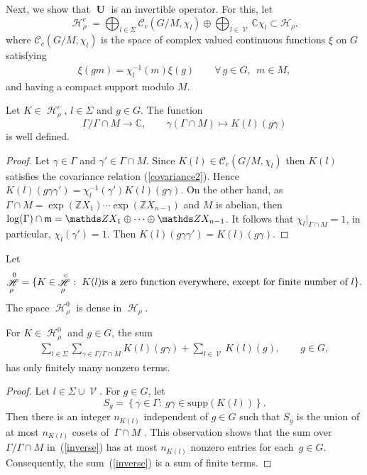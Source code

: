 \documentclass[pdftex]{sigma}
\newcommand{\set}[1]{\left\{#1\right\}}
\DeclareMathOperator{\U}{\mathbf{U}}
\DeclareMathOperator{\nongen}{\mathcal{V}}
\DeclareMathOperator{\Hi}{\mathscr{H}}
\def\dsc{{\mathds C}}
\def\dsz{{\mathds Z}}
\begin{document}
Next, we show that $\U$ is an invertible operator. For this, let
\[
 \Hi_\rho^c =  \bigoplus_{l\in \Sigma} \mathcal{C}_c(G/M,
\chi_l) \oplus \bigoplus_{l\in \nongen} \mathds{C} \chi_l \subset
\mathscr{H}_\rho,
\]
 where $\mathcal{C}_c(G/M, \chi_l)$ is the space
of complex valued continuous functions $\xi$ on $G$ satisfying
\begin{gather}\label{covariance2}
\xi(gm)=\chi_l^{-1}(m) \xi(g) \qquad
  \forall\, g\in G, \ \ m\in M,
\end{gather}
and having a compact support modulo $M$.



\begin{lemma} Let $K\in \Hi_\rho^c$, $l\in \Sigma$ and $g\in G$. The
function
\[
\Gamma/\Gamma\cap
M \rightarrow \dsc, \qquad \gamma (\Gamma\cap M)\mapsto
K(l)(g\gamma)
\]
 is well defined.
\end{lemma}

\begin{proof} Let $\gamma\in \Gamma$ and $\gamma'\in\Gamma\cap M$.
Since $K(l)\in \mathcal{C}_c(G/M, \chi_l)$ then $K(l)$ satisf\/ies the
covariance relation (\ref{covariance2}). Hence $
K(l)(g\gamma\gamma') = \chi_l^{-1}(\gamma') K(l)(g\gamma)$. On the
other hand, as $\Gamma\cap M= \exp(\dsz X_1)\cdots \exp(\dsz
X_{n-1})$ and $M$ is abelian, then $\log(\Gamma)\cap \frak m= \dsz
X_1\oplus \dots \oplus \dsz X_{n-1}$. It follows that
$\chi_l\vert_{\Gamma\cap M}=1$, in particular, $\chi_l(\gamma')=1$.
Then $ K(l)(g\gamma\gamma') = K(l)(g\gamma)$.
\end{proof}

Let
\begin{gather*}
 \Hi_\rho^0 =\{K\in \Hi_\rho^c:\ K(l)  \mbox{is a zero function everywhere, except
for f\/inite number of  } l\}.
\end{gather*}
The space $ \Hi_\rho^0$ is dense in $\Hi_\rho$.


\begin{lemma} For $K\in \Hi_\rho^0 $ and $g\in G$, the sum
\begin{gather}\label{inverse}
  \sum_{l\in \Sigma} \sum_{\gamma\in \Gamma/\Gamma\cap
M} K(l)(g\gamma)+ \sum _{l\in \nongen} K(l)(g), \qquad g\in
G,
\end{gather} has only finitely many nonzero terms.
\end{lemma}

\begin{proof} Let  $l\in \Sigma\cup \nongen$.
For $g\in G$, let
\[
S_g=\set{\gamma\in \Gamma:\ g\gamma\in \mathrm{supp}(K(l))}.
\]
Then there is an integer $n_{K(l)}$ independent of $g\in G$ such
that $S_g$ is the union of at most $n_{K(l)}$ cosets of~$\Gamma\cap M$ \cite[Lemma~3.2]{Cor4}. This observation shows that the sum
over $\Gamma/\Gamma\cap M$  in~(\ref{inverse}) has at most
$n_{K(l)}$ nonzero entries for each~$g\in G$. Consequently, the sum~(\ref{inverse}) is a sum of f\/inite terms.
\end{proof}
\end{document}
